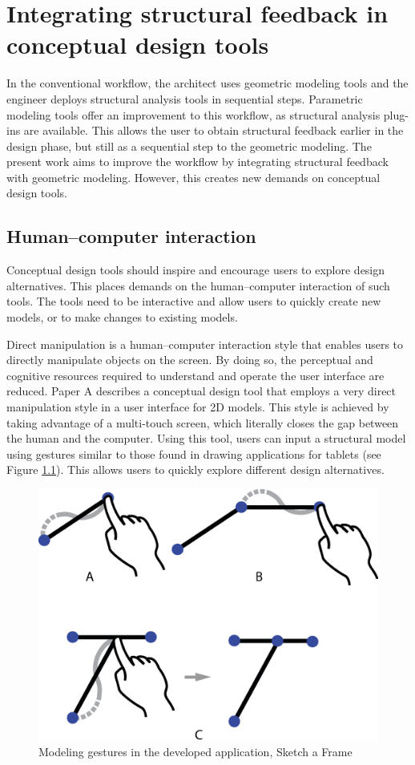 \chapter{Integrating structural feedback in conceptual design tools}
\label{ch:Integrating structural feedback}
In the conventional workflow, the architect uses geometric modeling tools and the engineer deploys structural analysis tools in sequential steps. Parametric modeling tools offer an improvement to this workflow, as structural analysis plug-ins are available. This allows the user to obtain structural feedback earlier in the design phase, but still as a sequential step to the geometric modeling. The present work aims to improve the workflow by integrating structural feedback with geometric modeling. However, this creates new demands on conceptual design tools. 

\section{Human--computer interaction}
Conceptual design tools should inspire and encourage users to explore design alternatives. This places demands on the human--computer interaction of such tools. The tools need to be interactive and allow users to quickly create new models, or to make changes to existing models. 

Direct manipulation is a human--computer interaction style that enables users to directly manipulate objects on the screen. By doing so, the perceptual and cognitive resources required to understand and operate the user interface are reduced. Paper A describes a conceptual design tool that employs a very direct manipulation style in a user interface for 2D models. This style is achieved by taking advantage of a multi-touch screen, which literally closes the gap between the human and the computer. Using this tool, users can input a structural model using gestures similar to those found in drawing applications for tablets (see Figure \ref{fig:interaction}). This allows users to quickly explore different design alternatives.

\begin{figure}
  \includegraphics[width=330pt]{graphics/interaction.eps}
  \caption{Modeling gestures in the developed application, Sketch a Frame}
  \label{fig:interaction}
\end{figure}


